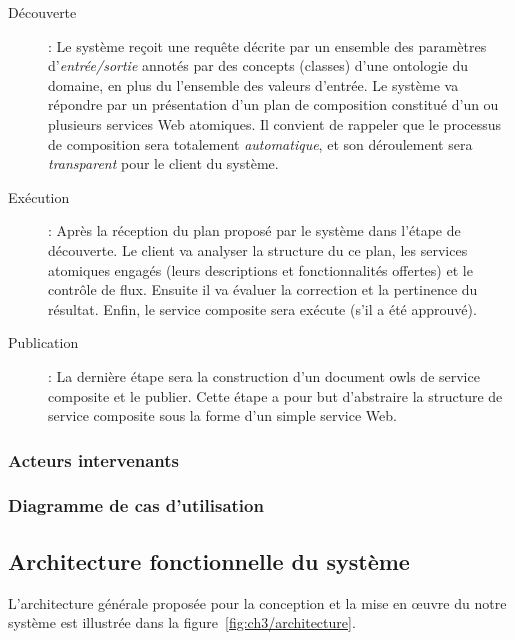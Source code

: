 \renewcommand{\descriptionlabel}[1]{\hspace{0.5cm}\textbullet~\textsf{#1}}
\begin{description}
\item [Découverte]: Le système reçoit une requête décrite par un
  ensemble des paramètres d'\emph{entrée/sortie} annotés par des
  concepts (classes) d'une ontologie du domaine, en plus du l'ensemble
  des valeurs d'entrée. Le système va répondre par un présentation
  d'un plan de composition constitué d'un ou plusieurs services Web
  atomiques. Il convient de rappeler que le processus de composition
  sera totalement \emph{automatique}, et son déroulement sera
  \emph{transparent} pour le client du système.

\item [Exécution]: Après la réception du plan proposé par le système
  dans l'étape de découverte. Le client va analyser la structure du ce
  plan, les services atomiques engagés (leurs descriptions et
  fonctionnalités offertes) et le contrôle de flux. Ensuite il va
  évaluer la correction et la pertinence du résultat. Enfin, le
  service composite sera exécute (s'il a été approuvé).\medskip

\item [Publication]: La dernière étape sera la construction d'un
  document \acrshort{owls} de service composite et le publier. Cette
  étape a pour but d'abstraire la structure de service composite sous
  la forme d'un simple service Web.\medskip
\end{description}
\enddescription

\newpage
\subsubsection{Acteurs intervenants}
\label{sec:ch3/presentation-actors}

\subsubsection{Diagramme de cas d’utilisation}
\label{sec:ch3/presentation-use-cases}

\newpage
\subsection{Architecture fonctionnelle du système}
\label{sec:ch3/presentation-architecture}

L'architecture générale proposée pour la conception et la mise en
œuvre du notre système est illustrée dans la
figure~\ref{fig:ch3/architecture}.

